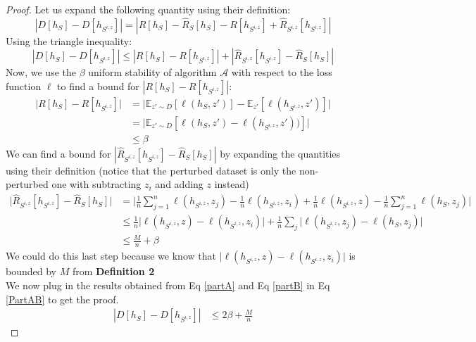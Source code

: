 \documentclass{article}
\begin{document}
\begin{proof}
Let us expand the following quantity using their definition: 
\begin{equation}\label{def_risk}
|D[h_S] - D[h_{S^{i,z}}]| = |R[h_S] - \hat{R}_S[h_S] - R[h_{S^{i,z}}] + \hat{R}_{S^{i,z}}[h_{S^{i,z}}]|
\end{equation}
Using the triangle inequality:
\begin{equation}
|D[h_S] - D[h_{S^{i,z}}]| \leq |R[h_S] - R[h_{S^{i,z}}]| + |\hat{R}_{S^{i,z}}[h_{S^{i,z}}] - \hat{R}_S[h_S]| \label{PartAB}
\end{equation}
Now, we use the $\beta$ uniform stability of algorithm $\mathcal{A}$ with respect to the loss function $\ell$ to find a bound for $|R[h_S] - R[h_{S^{i,z}}]|$:
\begin{equation}
\begin{split}
\bigl|R[h_S] - R[h_{S^{i,z}}]\bigr| &= \bigl| \mathbb{E}_{z' \sim D} [\ell(h_S, z')] - \mathbb{E}_{z'} [\ell(h_{S^{i,z}}, z')] \bigr| \\ 
&= \bigl|\mathbb{E}_{z' \sim D} [\ell(h_S, z') - \ell(h_{S^{i,z}}, z'))]\bigr| \\
& \leq \beta \label{partA}
\end{split}
\end{equation}
We can find a bound for $|\hat{R}_{S^{i,z}}[h_{S^{i,z}}] - \hat{R}_S[h_S]|$ by expanding the quantities using their definition (notice that the perturbed dataset is only the non-perturbed one with subtracting $z_i$ and adding $z$ instead)
\begin{equation}
\begin{split}
\bigl|\hat{R}_{S^{i,z}}[h_{S^{i,z}}] - \hat{R}_S[h_S]\bigr| &= \biggr|\frac{1}{n}\sum_{j=1}^{n}\ell(h_{S^{i,z}}, z_j) - \frac{1}{n}\ell(h_{S^{i,z}}, z_i) + \frac{1}{n}\ell(h_{S^{i,z}}, z) - \frac{1}{n}\sum_{j=1}^{n}\ell(h_S, z_j)\biggl|\\
&\leq \frac{1}{n} \biggl|\ell(h_{S^{i,z}}, z) - \ell(h_{S^{i,z}}, z_i)\biggr| + \frac{1}{n}\sum_j\biggl|\ell(h_{S^{i,z}}, z_j) -  \ell(h_S, z_j)\biggr| \\
&\leq \frac{M}{n} + \beta \label{partB}
\end{split}
\end{equation}
We could do this last step because we know that $\biggl|\ell(h_{S^{i,z}}, z) - \ell(h_{S^{i,z}}, z_i)\biggr|$ is bounded by $M$ from \textbf{Definition 2}  \\
We now plug in the results obtained from Eq \ref{partA} and Eq \ref{partB} in Eq \ref{PartAB} to get the proof.
\begin{equation}\label{proof1}
\begin{split}
|D[h_S] - D[h_{S^{i,z}}]| & \leq 2\beta + \frac{M}{n}
\end{split}
\end{equation}
\end{proof}
\end{document}
